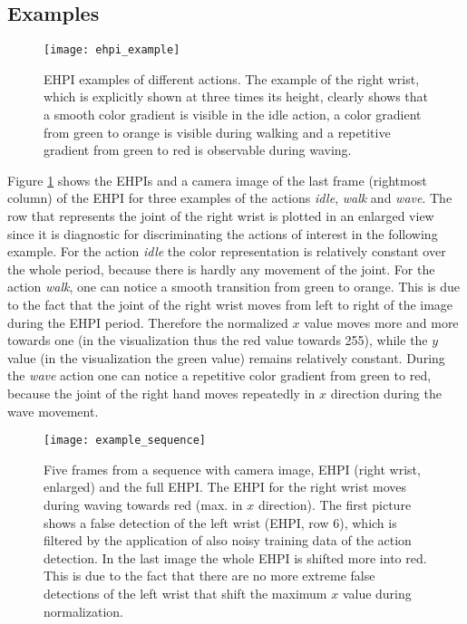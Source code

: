 \documentclass[a4paper, 10pt, conference]{ieeeconf}
\begin{document}
\subsection{Examples}
\begin{figure}
  \centering
  \texttt{[image: ehpi\_example]}
  \caption{EHPI examples of different actions. The example of the right wrist, which is explicitly shown at three times its height, clearly shows that a smooth color gradient is visible in the idle action, a color gradient from green to orange is visible during walking and a repetitive gradient from green to red is observable during waving.}
  \label{fig:ehpi_example}
\end{figure}
Figure \ref{fig:ehpi_example} shows the EHPIs and a camera image of the last frame (rightmost column) of the EHPI for three examples of the actions \textit{idle}, \textit{walk} and \textit{wave}. The row that represents the joint of the right wrist is plotted in an enlarged view since it is diagnostic for discriminating the actions of interest in the following example. For the action \textit{idle} the color representation is relatively constant over the whole period, because there is hardly any movement of the joint. For the action \textit{walk}, one can notice a smooth transition from green to orange. This is due to the fact that the joint of the right wrist moves from left to right of the image during the EHPI period. Therefore the normalized $x$ value moves more and more towards one (in the visualization thus the red value towards 255), while the $y$ value (in the visualization the green value) remains relatively constant. During the \textit{wave} action one can notice a repetitive color gradient from green to red, because the joint of the right hand moves repeatedly in $x$ direction during the wave movement.

\begin{figure}
  \centering
  \texttt{[image: example\_sequence]}
  \caption{Five frames from a sequence with camera image, EHPI (right wrist, enlarged) and the full EHPI. The EHPI for the right wrist moves during waving towards red (max. in $x$ direction). The first picture shows a false detection of the left wrist (EHPI, row 6), which is filtered by the application of also noisy training data of the action detection. In the last image the whole EHPI is shifted more into red. This is due to the fact that there are no more extreme false detections of the left wrist that shift the maximum $x$ value during normalization.}
  \label{fig:example_sequence}
\end{figure}
\end{document}
